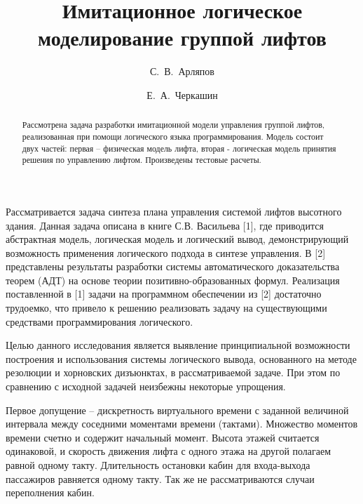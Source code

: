 \title{Имитационное логическое моделирование группой лифтов}

\author{
  С.~В.~Арляпов
  \and
  Е.~А.~Черкашин
}


\maketitle

\begin{abstract}
Рассмотрена задача разработки имитационной модели управления группой лифтов, реализованная при помощи логического языка программирования. Модель состоит двух частей: первая -- физическая модель лифта, вторая - логическая модель принятия решения по управлению лифтом. Произведены тестовые расчеты.

\end{abstract}

Рассматривается задача синтеза плана управления системой лифтов высотного здания. Данная задача описана в книге С.В. Васильева [1], где приводится абстрактная модель, логическая модель и логический вывод, демонстрирующий возможность применения логического подхода в синтезе управления. В [2] представлены результаты разработки системы автоматического доказательства теорем (АДТ) на основе теории позитивно-образованных формул. Реализация поставленной в [1] задачи на программном обеспечении из [2] достаточно трудоемко, что привело к решению реализовать задачу на существующими средствами программирования логического.

Целью данного исследования является выявление принципиальной возможности построения и использования системы логического вывода, основанного на методе резолюции и хорновских дизъюнктах, в рассматриваемой задаче. При этом по сравнению с исходной задачей неизбежны некоторые упрощения.

Первое допущение -- дискретность виртуального времени с заданной величиной интервала между соседними моментами времени (тактами). Множество моментов времени счетно и содержит начальный момент. Высота этажей считается одинаковой, и скорость движения лифта с одного этажа на другой полагаем равной одному такту. Длительность остановки кабин для входа-выхода пассажиров равняется одному такту.  Так же не рассматриваются случаи переполнения кабин.

